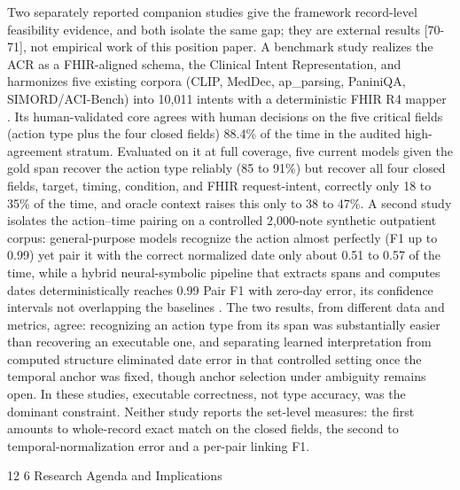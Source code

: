 \documentclass[3p,twocolumn]{elsarticle}
\makeatletter
\renewcommand\section{\@startsection{section}{1}{\z@}%
           {12\p@ \@plus 4\p@ \@minus 4\p@}%
           {6\p@ \@plus 4\p@ \@minus 3\p@}%
           {\normalsize\bfseries\boldmath}}
\makeatother
\begin{document}
Two separately reported companion studies give the framework record-level feasibility evidence, and both isolate the same gap; they are external results {[}70-71{]}, not empirical work of this position paper. A benchmark study realizes the ACR as a FHIR-aligned schema, the Clinical Intent Representation, and harmonizes five existing corpora (CLIP, MedDec, ap\_parsing, PaniniQA, SIMORD/ACI-Bench) into 10,011 intents with a deterministic FHIR R4 mapper \cite{ref70}. Its human-validated core agrees with human decisions on the five critical fields (action type plus the four closed fields) 88.4\% of the time in the audited high-agreement stratum. Evaluated on it at full coverage, five current models given the gold span recover the action type reliably (85 to 91\%) but recover all four closed fields, target, timing, condition, and FHIR request-intent, correctly only 18 to 35\% of the time, and oracle context raises this only to 38 to 47\%. A second study isolates the action--time pairing on a controlled 2,000-note synthetic outpatient corpus: general-purpose models recognize the action almost perfectly (F1 up to 0.99) yet pair it with the correct normalized date only about 0.51 to 0.57 of the time, while a hybrid neural-symbolic pipeline that extracts spans and computes dates deterministically reaches 0.99 Pair F1 with zero-day error, its confidence intervals not overlapping the baselines \cite{ref71}. The two results, from different data and metrics, agree: recognizing an action type from its span was substantially easier than recovering an executable one, and separating learned interpretation from computed structure eliminated date error in that controlled setting once the temporal anchor was fixed, though anchor selection under ambiguity remains open. In these studies, executable correctness, not type accuracy, was the dominant constraint. Neither study reports the set-level measures: the first amounts to whole-record exact match on the closed fields, the second to temporal-normalization error and a per-pair linking F1.

\section{Research Agenda and Implications}\label{research-agenda-and-implications}
\end{document}
